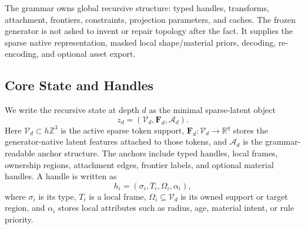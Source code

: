 \documentclass[sigconf,anonymous,review]{acmart}
\begin{document}
The grammar owns global recursive structure: typed handles, transforms, attachment, frontiers, constraints, projection parameters, and caches. The frozen generator is not asked to invent or repair topology after the fact. It supplies the sparse native representation, masked local shape/material priors, decoding, re-encoding, and optional asset export.

\subsection{Core State and Handles}
We write the recursive state at depth $d$ as the minimal sparse-latent object
\begin{equation}
z_d=(\mathcal V_d,\mathbf F_d,\mathcal A_d).
\end{equation}
Here $\mathcal V_d\subset h\mathbb Z^3$ is the active sparse token support, $\mathbf F_d:\mathcal V_d\rightarrow\mathbb R^q$ stores the generator-native latent features attached to those tokens, and $\mathcal A_d$ is the grammar-readable anchor structure. The anchors include typed handles, local frames, ownership regions, attachment edges, frontier labels, and optional material handles. A handle is written as
\begin{equation}
h_i=(\sigma_i,T_i,\Omega_i,\alpha_i),
\end{equation}
where $\sigma_i$ is its type, $T_i$ is a local frame, $\Omega_i\subseteq \mathcal V_d$ is its owned support or target region, and $\alpha_i$ stores local attributes such as radius, age, material intent, or rule priority.
\end{document}
